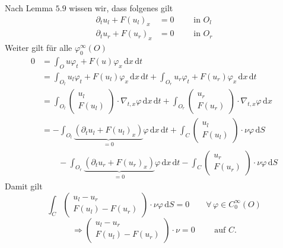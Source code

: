 \begin{beweis}
	Nach Lemma $5.9$ wissen wir, dass folgenes gilt
	\begin{align*}
		\partial_t u_l + F(u_l)_x &= 0 \qquad \text{ in }O_l \\
		\partial_t u_r + F(u_r)_x &= 0 \qquad \text{ in }O_r
	\end{align*}
	Weiter gilt für alle $\varphi_0^{\infty}(O)$
	\begin{align*}
		0 &= \int_{O}^{} u \varphi_t + F(u) \varphi_x \,\mathrm{d}x\,\mathrm{d}t \\
		&= \int_{O_l}^{} u_l \varphi_t + F(u_l) \varphi_x \,\mathrm{d}x\,\mathrm{d}t  +  \int_{O_r}^{} u_r \varphi_t + F(u_r) \varphi_x \,\mathrm{d}x\,\mathrm{d}t \\
		&= \int_{O_l}^{} \begin{pmatrix}
			u_l \\ F(u_l)
		\end{pmatrix} \cdot  \nabla_{t,x} \varphi \,\mathrm{d}x \, \mathrm{d}t + \int_{O_r}^{} \begin{pmatrix}
			u_r \\ F(u_r)
		\end{pmatrix} \cdot  \nabla_{t,x} \varphi \,\mathrm{d}x \\
		&= - \int_{O_l}^{} \underset{=0}{\underbrace{(\partial_t u_l + F(u_l)_x)}} \varphi \,\mathrm{d}x \,\mathrm{d}t + \int_{C}^{} \begin{pmatrix}
			u_l \\ F(u_l)
		\end{pmatrix} \cdot \nu \varphi \,\mathrm{d}S \\
		& \qquad - \int_{O_r}^{} \underset{=0}{\underbrace{(\partial_t u_r + F(u_r)_x)}} \varphi \,\mathrm{d}x \,\mathrm{d}t - \int_{C}^{} \begin{pmatrix}
					u_r \\ F(u_r)
				\end{pmatrix} \cdot \nu \varphi \,\mathrm{d}S
	\end{align*}
	Damit gilt
	\[
		\int_{C}^{} \begin{pmatrix}
			u_l - u_r \\ F(u_l)-F(u_r)
		\end{pmatrix} \cdot \nu \varphi \,\mathrm{d}S=0 \qquad \forall\, \varphi \in C^{\infty}_0(O)
	\]
	\[
		\Rightarrow \begin{pmatrix}
			u_l-u_r \\ F(u_l)- F(u_r)
		\end{pmatrix} \cdot \nu =0 \qquad \text{ auf }C.
	\]
\end{beweis}

